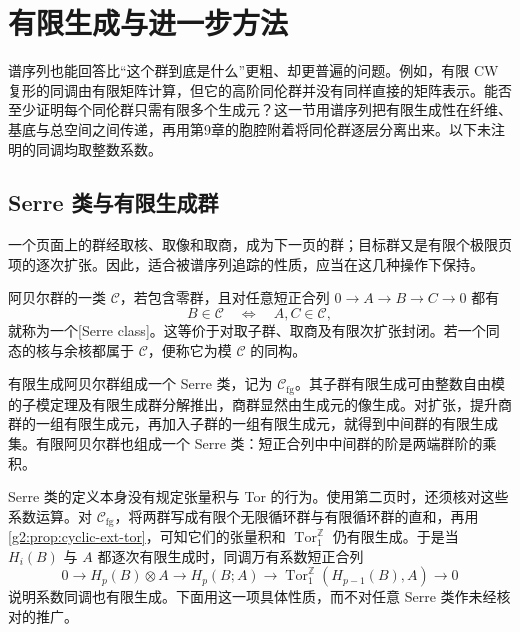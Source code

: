 
% 
% 
% 

\section{有限生成与进一步方法}
\label{g2:sec:1105}

谱序列也能回答比“这个群到底是什么”更粗、却更普遍的问题。例如，有限 CW 复形的同调由有限矩阵计算，但它的高阶同伦群并没有同样直接的矩阵表示。能否至少证明每个同伦群只需有限多个生成元？这一节用谱序列把有限生成性在纤维、基底与总空间之间传递，再用第9章的胞腔附着将同伦群逐层分离出来。以下未注明的同调均取整数系数。

\subsection{Serre 类与有限生成群}
\label{g2:subsec:1105:01}

一个页面上的群经取核、取像和取商，成为下一页的群；目标群又是有限个极限页项的逐次扩张。因此，适合被谱序列追踪的性质，应当在这几种操作下保持。

\begin{definition}[Serre 类]\label{g2:def:serre-class}
	阿贝尔群的一类 \(\mathcal C\)，若包含零群，且对任意短正合列 \(0\to A\to B\to C\to0\) 都有
	\[
		B\in\mathcal C\quad\Longleftrightarrow\quad A,C\in\mathcal C,
	\]
	就称为一个[Serre class]。这等价于对取子群、取商及有限次扩张封闭。若一个同态的核与余核都属于 \(\mathcal C\)，便称它为模 \(\mathcal C\) 的同构。
\end{definition}

有限生成阿贝尔群组成一个 Serre 类，记为 \(\mathcal C_{\mathrm{fg}}\)。其子群有限生成可由整数自由模的子模定理及有限生成群分解推出，商群显然由生成元的像生成。对扩张，提升商群的一组有限生成元，再加入子群的一组有限生成元，就得到中间群的有限生成集。有限阿贝尔群也组成一个 Serre 类：短正合列中中间群的阶是两端群阶的乘积。

\ProseParagraphBreak

Serre 类的定义本身没有规定张量积与 Tor 的行为。使用第二页时，还须核对这些系数运算。对 \(\mathcal C_{\mathrm{fg}}\)，将两群写成有限个无限循环群与有限循环群的直和，再用\cref{g2:prop:cyclic-ext-tor}，可知它们的张量积和 \(\operatorname{Tor}_1^{\mathbb Z}\) 仍有限生成。于是当 \(H_i(B)\) 与 \(A\) 都逐次有限生成时，同调万有系数短正合列
\begin{equation}\label{g2:eq:finite-generation-coefficients}
	0\longrightarrow H_p(B)\otimes A\longrightarrow H_p(B;A)
	\longrightarrow\operatorname{Tor}_1^{\mathbb Z}(H_{p-1}(B),A)\longrightarrow0
\end{equation}
说明系数同调也有限生成。下面用这一项具体性质，而不对任意 Serre 类作未经核对的推广。

